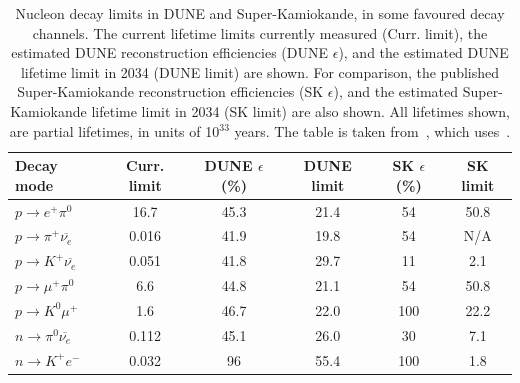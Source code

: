 \begin{table}
  \caption[Nucleon decay limits in DUNE and Super-Kamiokande, in some favoured decay channels]
          {Nucleon decay limits in DUNE and Super-Kamiokande, in some favoured decay channels. The current lifetime limits currently measured (Curr. limit), the estimated DUNE reconstruction efficiencies (DUNE $\epsilon$), and the estimated DUNE lifetime limit in 2034 (DUNE limit) are shown. For comparison, the published Super-Kamiokande reconstruction efficiencies (SK $\epsilon$), and the estimated Super-Kamiokande lifetime limit in 2034 (SK limit) are also shown. All lifetimes shown, are partial lifetimes, in units of 10$^{33}$ years. The table is taken from~\citep{MauryLifetime}, which uses~\citep{PDGReview}.}
  \centering
  \label{tab:NDKLim}
  \begin{tabular}{l c c c c c}
    \toprule
    {Decay mode}                               & {Curr. limit} & {DUNE $\epsilon$ (\%)} & {DUNE limit} & {SK $\epsilon$ (\%)} & {SK limit} \\ 
    \midrule
    $p \rightarrow e^{+} \pi^{0}$              & 16.7          & 45.3              & 21.4         & 54              & 50.8       \\
    
    $p \rightarrow \pi^{+} \overline{\nu_{e}}$ & 0.016         & 41.9              & 19.8         & 54              & N/A        \\
    
    $p \rightarrow K^{+} \overline{\nu_{e}}$   & 0.051         & 41.8              & 29.7         & 11              & 2.1        \\
    
    $p \rightarrow \mu^{+} \pi^{0}$            & 6.6           & 44.8              & 21.1         & 54              & 50.8       \\
    
    $p \rightarrow K^{0} \mu^{+}$              & 1.6           & 46.7              & 22.0         & 100             & 22.2       \\
    
    $n \rightarrow \pi^{0} \overline{\nu_{e}}$ & 0.112         & 45.1              & 26.0         & 30              & 7.1        \\
    
    $n \rightarrow K^{+} e^{-}$                & 0.032         & 96                & 55.4         & 100             & 1.8        \\
    \bottomrule
  \end{tabular}
\end{table}

